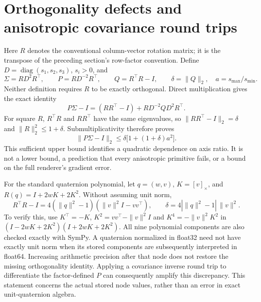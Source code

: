 \documentclass[11pt,a4paper]{article}
\begin{document}
\section{Orthogonality defects and anisotropic covariance round trips}
Here $R$ denotes the conventional column-vector rotation matrix; it is
the transpose of the preceding section's row-factor convention. Define
$D=\operatorname{diag}(s_1,s_2,s_3)$, $s_i>0$, and
\[
 \Sigma=RD^2R^\top,\qquad P=RD^{-2}R^\top,\qquad
 Q=R^\top R-I,\qquad \delta=\|Q\|_2,\quad
 a=s_{\max}/s_{\min}.
\]
Neither definition requires $R$ to be exactly orthogonal. Direct
multiplication gives the exact identity
\[
 P\Sigma-I=(RR^\top-I)+RD^{-2}QD^2R^\top.
\]
For square $R$, $R^\top R$ and $RR^\top$ have the same eigenvalues,
so $\|RR^\top-I\|_2=\delta$ and $\|R\|_2^2\le1+\delta$.
Submultiplicativity therefore proves
\begin{equation}\label{eq:roundtrip-defect}
 \|P\Sigma-I\|_2\le
 \delta\bigl[1+(1+\delta)a^2\bigr].
\end{equation}
This sufficient upper bound identifies a quadratic dependence on axis
ratio. It is not a lower bound, a prediction that every anisotropic
primitive fails, or a bound on the full renderer's gradient error.

For the standard quaternion polynomial, let $q=(w,v)$,
$K=[v]_\times$, and $R(q)=I+2wK+2K^2$. Without assuming unit norm,
\[
 R^\top R-I=4(\|q\|^2-1)(\|v\|^2I-vv^\top),\qquad
 \delta=4|\|q\|^2-1|\,\|v\|^2.
\]
To verify this, use $K^\top=-K$, $K^2=vv^\top-\|v\|^2I$ and
$K^4=-\|v\|^2K^2$ in $(I-2wK+2K^2)(I+2wK+2K^2)$.
All nine polynomial components are also checked exactly with SymPy.
A quaternion normalized in float32 need not have exactly unit norm
when its stored components are subsequently interpreted in float64.
Increasing arithmetic precision after that node does not restore
the missing orthogonality identity. Applying a covariance inverse
round trip to differentiate the factor-defined $P$ can consequently
amplify this discrepancy. This statement concerns the actual stored
node values, rather than an error in exact unit-quaternion algebra.
\end{document}

